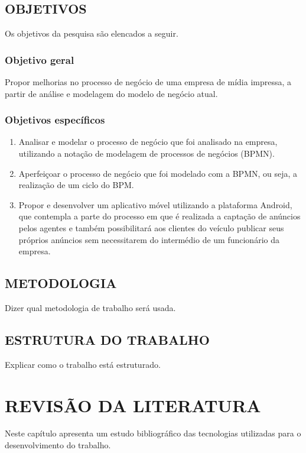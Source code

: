 \documentclass[
	12pt,				%
	openright,			%
	oneside,			%
	a4paper,			%
	chapter=TITLE,		%
	section=TITLE,		%
	english,			%
	french,				%
	spanish,			%
	brazil				%
	]{abntex2}
\begin{document}
\section{OBJETIVOS}

Os objetivos da pesquisa são elencados a seguir.

\subsection{Objetivo geral}

Propor melhorias no processo de negócio de uma empresa de mídia impressa, a partir de análise e modelagem do modelo de negócio atual.

\subsection{Objetivos específicos}

\begin{enumerate}[label=\itshape\alph*\upshape)]
	\item Analisar e modelar o processo de negócio que foi analisado na empresa, utilizando a notação de modelagem de processos de negócios (BPMN).
	\item	Aperfeiçoar o processo de negócio que foi modelado com a BPMN, ou seja, a realização de um ciclo do BPM.
	\item	Propor e desenvolver um aplicativo móvel utilizando a plataforma Android, que contempla a parte do processo em que é realizada a captação de anúncios pelos agentes e também possibilitará aos clientes do veículo publicar seus próprios anúncios sem necessitarem do intermédio de um funcionário da empresa. 
	
\end{enumerate}

\section{METODOLOGIA}

Dizer qual metodologia de trabalho será usada.

\section{ESTRUTURA DO TRABALHO}

Explicar como o trabalho está estruturado.

\chapter{REVISÃO DA LITERATURA}\label{cap-revisao}
Neste capítulo apresenta um estudo bibliográfico das tecnologias utilizadas para o desenvolvimento do trabalho.
\end{document}
